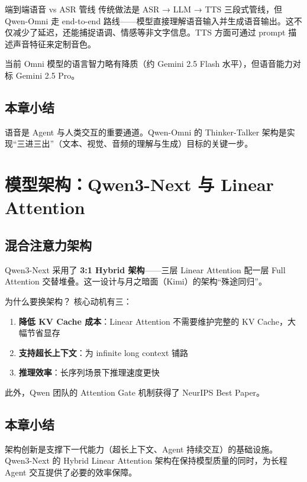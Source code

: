 \documentclass[a4paper]{article}
\begin{document}
\begin{knowledgebox}{端到端语音 vs ASR 管线}
传统做法是 ASR → LLM → TTS 三段式管线，但 Qwen-Omni 走 end-to-end 路线——模型直接理解语音输入并生成语音输出。这不仅减少了延迟，还能捕捉语调、情感等非文字信息。TTS 方面可通过 prompt 描述声音特征来定制音色。
\end{knowledgebox}

当前 Omni 模型的语言智力略有降质（约 Gemini 2.5 Flash 水平），但语音能力对标 Gemini 2.5 Pro。

\subsection{本章小结}

语音是 Agent 与人类交互的重要通道。Qwen-Omni 的 Thinker-Talker 架构是实现``三进三出''（文本、视觉、音频的理解与生成）目标的关键一步。

\section{模型架构：Qwen3-Next 与 Linear Attention}

\subsection{混合注意力架构}

Qwen3-Next 采用了 \textbf{3:1 Hybrid 架构}——三层 Linear Attention 配一层 Full Attention 交替堆叠。这一设计与月之暗面（Kimi）的架构``殊途同归''。

\begin{importantbox}{为什么要换架构？}
核心动机有三：
\begin{enumerate}
    \item \textbf{降低 KV Cache 成本}：Linear Attention 不需要维护完整的 KV Cache，大幅节省显存
    \item \textbf{支持超长上下文}：为 infinite long context 铺路
    \item \textbf{推理效率}：长序列场景下推理速度更快
\end{enumerate}
此外，Qwen 团队的 Attention Gate 机制获得了 NeurIPS Best Paper。
\end{importantbox}

\subsection{本章小结}

架构创新是支撑下一代能力（超长上下文、Agent 持续交互）的基础设施。Qwen3-Next 的 Hybrid Linear Attention 架构在保持模型质量的同时，为长程 Agent 交互提供了必要的效率保障。
\end{document}
